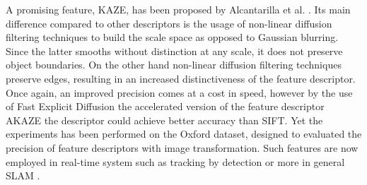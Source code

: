 A promising feature, KAZE, has been proposed by Alcantarilla et al. \cite{alcantarilla12}. Its main difference compared to other descriptors is the usage of non-linear diffusion filtering techniques \cite{weickert98} to build the scale space as opposed to Gaussian blurring. Since the latter smooths without distinction at any scale, it does not preserve object boundaries. On the other hand non-linear diffusion filtering techniques preserve edges, resulting in an increased distinctiveness of the feature descriptor. Once again, an improved precision comes at a cost in speed, however by the use of Fast Explicit Diffusion \cite{goesele2010} the accelerated version of the feature descriptor AKAZE \cite{alcantarilla13} the descriptor could achieve better accuracy than SIFT. Yet the experiments has been performed on the Oxford dataset, designed to evaluated the precision of feature descriptors with image transformation. Such features are now employed in real-time system such as tracking by detection \cite{nebehay2014,pieropan15,pieropan15b} or more in general SLAM \cite{murartal2015}. 

